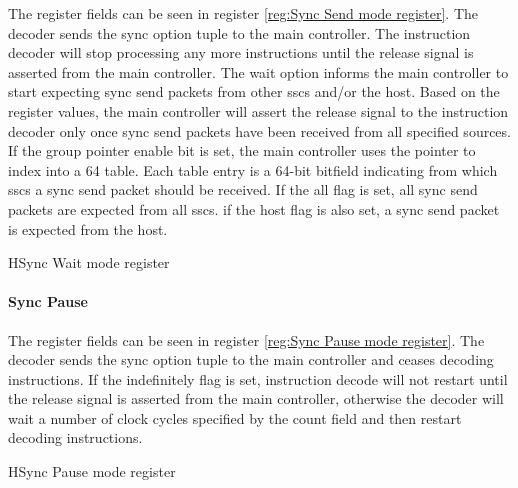 The register fields can be seen in register \ref{reg:Sync Send mode register}.
The decoder sends the sync option tuple to the main controller.
The instruction decoder will stop processing any more instructions until the release signal is asserted from the main controller.
The wait option informs the main controller to start expecting sync send packets from other \acp{ssc} and/or the host.
Based on the register values, the main controller will assert the release signal to the instruction decoder only once sync send packets have been received from all specified sources.
If the group pointer enable bit is set, the main controller uses the pointer to index into a 64 table. 
Each table entry is a 64-bit bitfield indicating from which \acp{ssc} a sync send packet should be received.
If the all flag is set, all sync send packets are expected from all \acp{ssc}.
if the host flag is also set, a sync send packet is expected from the host.
\begin{register}{H}{Sync Wait mode register}{}%
  \label{reg:Sync Wait mode register}
  \vspace{-20pt}
\end{register}


\paragraph{Sync Pause}

The register fields can be seen in register \ref{reg:Sync Pause mode register}.
The decoder sends the sync option tuple to the main controller and ceases decoding instructions.
If the indefinitely flag is set, instruction decode will not restart until the release signal is asserted from the main controller, otherwise the decoder will wait a number of clock cycles specified by the count field and then restart decoding instructions.
\begin{register}{H}{Sync Pause mode register}{}%
  \label{reg:Sync Pause mode register}
  \vspace{-10pt}
\end{register}

